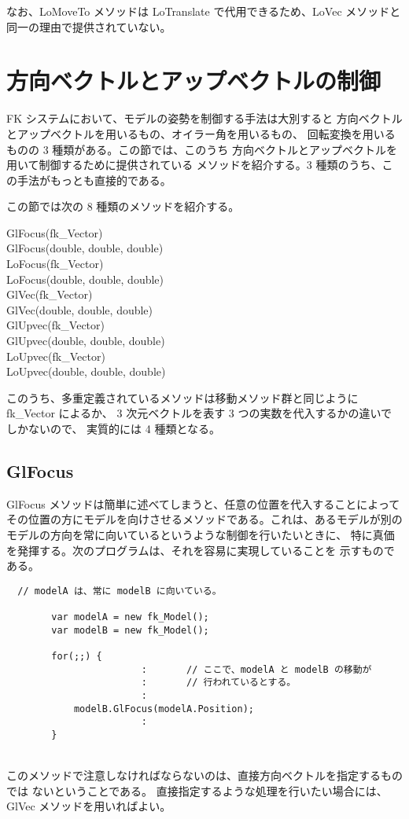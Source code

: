なお、LoMoveTo メソッドは LoTranslate で代用できるため、LoVec メソッドと
同一の理由で提供されていない。

\section{方向ベクトルとアップベクトルの制御}
FK システムにおいて、モデルの姿勢を制御する手法は大別すると
方向ベクトルとアップベクトルを用いるもの、オイラー角を用いるもの、
回転変換を用いるものの 3 種類がある。この節では、このうち
方向ベクトルとアップベクトルを用いて制御するために提供されている
メソッドを紹介する。3 種類のうち、この手法がもっとも直接的である。

この節では次の 8 種類のメソッドを紹介する。
\begin{description}
\item[GlFocus(fk\_Vector)]
\item[GlFocus(double, double, double)]
\item[LoFocus(fk\_Vector)]
\item[LoFocus(double, double, double)]
\item[GlVec(fk\_Vector)]
\item[GlVec(double, double, double)]
\item[GlUpvec(fk\_Vector)]
\item[GlUpvec(double, double, double)]
\item[LoUpvec(fk\_Vector)]
\item[LoUpvec(double, double, double)]
\end{description}

このうち、多重定義されているメソッドは移動メソッド群と同じように fk\_Vector によるか、
3 次元ベクトルを表す 3 つの実数を代入するかの違いでしかないので、
実質的には 4 種類となる。

\subsection{GlFocus}
GlFocus メソッドは簡単に述べてしまうと、任意の位置を代入することによって
その位置の方にモデルを向けさせるメソッドである。これは、あるモデルが別の
モデルの方向を常に向いているというような制御を行いたいときに、
特に真価を発揮する。次のプログラムは、それを容易に実現していることを
示すものである。
\\
\begin{breakbox}
\begin{verbatim}
  // modelA は、常に modelB に向いている。

        var modelA = new fk_Model();
        var modelB = new fk_Model();

        for(;;) {
                        :       // ここで、modelA と modelB の移動が
                        :       // 行われているとする。
                        :
            modelB.GlFocus(modelA.Position);
                        :
        }
\end{verbatim}
\end{breakbox}
~ \\
このメソッドで注意しなければならないのは、直接方向ベクトルを指定するものでは
ないということである。
直接指定するような処理を行いたい場合には、GlVec メソッドを用いればよい。

